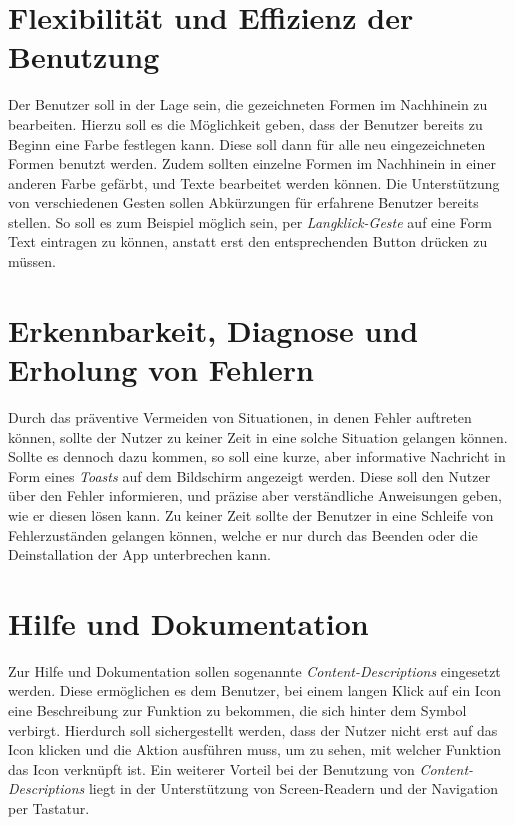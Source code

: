 \section{Flexibilität und Effizienz der Benutzung}
Der Benutzer soll in der Lage sein, die gezeichneten Formen im Nachhinein zu bearbeiten.
Hierzu soll es die Möglichkeit geben, dass der Benutzer bereits zu Beginn eine Farbe festlegen kann.
Diese soll dann für alle neu eingezeichneten Formen benutzt werden.
Zudem sollten einzelne Formen im Nachhinein in einer anderen Farbe gefärbt, und Texte bearbeitet werden können.
Die Unterstützung von verschiedenen Gesten sollen Abkürzungen für erfahrene Benutzer bereits stellen.
So soll es zum Beispiel möglich sein, per \emph{Langklick-Geste} auf eine Form Text eintragen zu können, anstatt erst den entsprechenden Button drücken zu müssen.

\section{Erkennbarkeit, Diagnose und Erholung von Fehlern}
Durch das präventive Vermeiden von Situationen, in denen Fehler auftreten können, sollte der Nutzer zu keiner Zeit in eine solche Situation gelangen können.
Sollte es dennoch dazu kommen, so soll eine kurze, aber informative Nachricht in Form eines \emph{Toasts} auf dem Bildschirm angezeigt werden.
Diese soll den Nutzer über den Fehler informieren, und präzise aber verständliche Anweisungen geben, wie er diesen lösen kann.
Zu keiner Zeit sollte der Benutzer in eine Schleife von Fehlerzuständen gelangen können, welche er nur durch das Beenden oder die Deinstallation der App unterbrechen kann. 

\section{Hilfe und Dokumentation}
Zur Hilfe und Dokumentation sollen sogenannte \emph{Content-Descriptions} eingesetzt werden.
Diese ermöglichen es dem Benutzer, bei einem langen Klick auf ein Icon eine Beschreibung zur Funktion zu bekommen, die sich hinter dem Symbol verbirgt.
Hierdurch soll sichergestellt werden, dass der Nutzer nicht erst auf das Icon klicken und die Aktion ausführen muss, um zu sehen, mit welcher Funktion das Icon verknüpft ist.
Ein weiterer Vorteil bei der Benutzung von \emph{Content-Descriptions} liegt in der Unterstützung von Screen-Readern und der Navigation per Tastatur.

